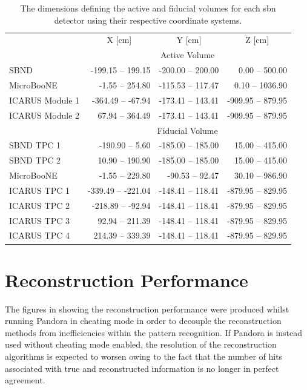 \begin{table}[h!]
\begin{tabular}{lrrr}
 & \multicolumn{1}{c}{X [cm]} & \multicolumn{1}{c}{Y [cm]} & \multicolumn{1}{c}{Z [cm]} \\ \cline{2-4} 
 & \multicolumn{3}{c}{Active Volume} \\ \cline{2-4} 
SBND & -199.15 -- 199.15 & -200.00 -- 200.00 & 0.00 -- 500.00 \\
MicroBooNE & -1.55 -- 254.80 & -115.53 -- 117.47 & 0.10 -- 1036.90 \\
ICARUS Module 1 & -364.49 -- -67.94 & -173.41 -- 143.41 & -909.95 -- 879.95 \\
ICARUS Module 2 & 67.94 -- 364.49 & -173.41 -- 143.41 & -909.95 -- 879.95 \\ \cline{2-4} 
 & \multicolumn{3}{c}{Fiducial Volume} \\ \cline{2-4} 
SBND TPC 1 & -190.90 -- 5.60 & -185.00 -- 185.00 & 15.00 -- 415.00 \\
SBND TPC 2 & 10.90 -- 190.90 & -185.00 -- 185.00 & 15.00 -- 415.00 \\
MicroBooNE & -1.55 -- 229.80 & -90.53 -- 92.47 & 30.10 -- 986.90 \\
ICARUS TPC 1 & -339.49 -- -221.04 & -148.41 -- 118.41 & -879.95 -- 829.95 \\
ICARUS TPC 2 & -218.89 -- -92.94 & -148.41 -- 118.41 & -879.95 -- 829.95 \\
ICARUS TPC 3 & 92.94 -- 211.39 & -148.41 -- 118.41 & -879.95 -- 829.95 \\
ICARUS TPC 4 & 214.39 -- 339.39 & -148.41 -- 118.41 & -879.95 -- 829.95
\end{tabular}
\caption[The active and fiducial volumes of the \gls{sbn} detectors.]{The dimensions defining the active and fiducial volumes for each \gls{sbn} detector using their respective coordinate systems.} \label{table:active_and_fiducial_volumes}
\end{table}

\chapter{Reconstruction Performance}
\label{app:reconstruction_performance}

The figures in  showing the reconstruction performance were produced whilst running Pandora in cheating mode in order to decouple the reconstruction methods from inefficiencies within the pattern recognition. If Pandora is instead used without cheating mode enabled, the resolution of the reconstruction algorithms is expected to worsen owing to the fact that the number of hits associated with true and reconstructed information is no longer in perfect agreement. 

